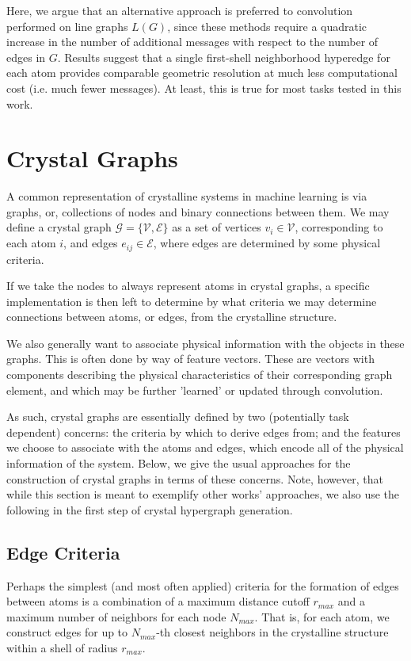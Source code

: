 \documentclass[10pt,a4paper]{article}
\begin{document}
Here, we argue that an alternative approach is preferred to convolution performed on line graphs $L(G)$, since these methods require a quadratic increase in the number of additional messages with respect to the number of edges in $G$. Results suggest that a single first-shell neighborhood hyperedge for each atom provides comparable geometric resolution at much less computational cost (i.e. much fewer messages). At least, this is true for most tasks tested in this work.

\section{Crystal Graphs}
A common representation of crystalline systems in machine learning is via graphs, or, collections of nodes and binary connections between them. We may define a crystal graph $\mathcal{G}=\lbrace \mathcal{V},\mathcal{E}\rbrace$ as a set of vertices $v_i\in\mathcal{V}$, corresponding to each atom $i$, and edges $e_{ij}\in\mathcal{E}$, where edges are determined by some physical criteria.

If we take the nodes to always represent atoms in crystal graphs, a specific implementation is then left to determine by what criteria we may determine connections between atoms, or edges, from the crystalline structure. 

We also generally want to associate physical information with the objects in these graphs. This is often done by way of feature vectors. These are vectors with components describing the physical characteristics of their corresponding graph element, and which may be further 'learned' or updated through convolution.

As such, crystal graphs are essentially defined by two (potentially task dependent) concerns: the criteria by which to derive edges from; and the features we choose to associate with the atoms and edges, which encode all of the physical information of the system. Below, we give the usual approaches for the construction of crystal graphs in terms of these concerns. Note, however, that while this section is meant to exemplify other works' approaches, we also use the following in the first step of crystal hypergraph generation.

\subsection{Edge Criteria}
Perhaps the simplest (and most often applied) criteria for the formation of edges between atoms is a combination of a maximum distance cutoff $r_{max}$ and a maximum number of neighbors for each node $N_{max}$. That is, for each atom, we construct edges for up to $N_{max}$-th closest neighbors in the crystalline structure within a shell of radius $r_{max}$.
\end{document}

